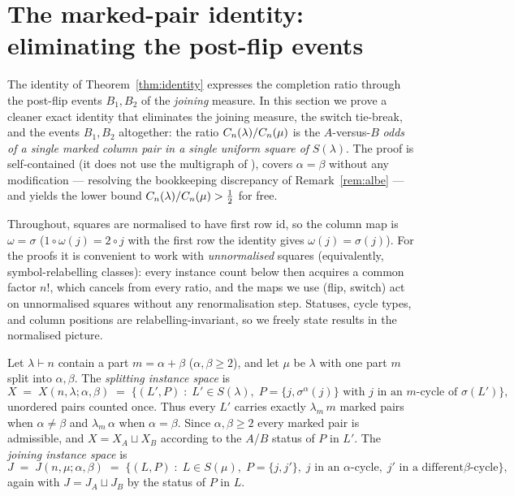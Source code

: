 \section{The marked-pair identity: eliminating the post-flip events}
\label{sec:marked}

The identity of Theorem~\ref{thm:identity} expresses the completion
ratio through the post-flip events $B_1,B_2$ of the \emph{joining}
measure.  In this section we prove a cleaner exact identity that
eliminates the joining measure, the switch tie-break, and the events
$B_1,B_2$ altogether: the ratio $C_n(\lambda)/C_n(\mu)$ is the
$A$-versus-$B$ \emph{odds of a single marked column pair in a single
uniform square of} $S(\lambda)$.  The proof is self-contained (it does
not use the multigraph of \cite{CGW08}), covers $\alpha=\beta$ without
any modification --- resolving the bookkeeping discrepancy of
Remark~\ref{rem:albe} --- and yields the lower bound
$C_n(\lambda)/C_n(\mu)>\tfrac12$ for free.

Throughout, squares are normalised to have first row $\mathrm{id}$, so
the column map is $\omega=\sigma$ ($1\circ\omega(j)=2\circ j$ with the
first row the identity gives $\omega(j)=\sigma(j)$).  For the proofs it
is convenient to work with \emph{unnormalised} squares (equivalently,
symbol-relabelling classes): every instance count below then acquires a
common factor $n!$, which cancels from every ratio, and the maps we use
(flip, switch) act on unnormalised squares without any renormalisation
step.  Statuses, cycle types, and column positions are
relabelling-invariant, so we freely state results in the normalised
picture.

\begin{definition}\label{def:marked}
Let $\lambda\vdash n$ contain a part $m=\alpha+\beta$
($\alpha,\beta\ge2$), and let $\mu$ be $\lambda$ with one part $m$
split into $\alpha,\beta$.  The \emph{splitting instance space} is
\[
X \;=\; X(n,\lambda;\alpha,\beta)
\;=\;\bigl\{(L',P)\;:\;L'\in S(\lambda),\;
P=\{j,\sigma^\alpha(j)\}\text{ with } j\text{ in an $m$-cycle of }
\sigma(L')\bigr\},
\]
unordered pairs counted once.  Thus every $L'$ carries exactly
$\lambda_m\, m$ marked pairs when $\alpha\neq\beta$ and
$\lambda_m\,\alpha$ when $\alpha=\beta$.  Since $\alpha,\beta\ge 2$
every marked pair is admissible, and $X=X_A\sqcup X_B$ according to the
$A$/$B$ status of $P$ in $L'$.  The \emph{joining instance space} is
\[
J \;=\; J(n,\mu;\alpha,\beta)
\;=\;\bigl\{(L,P)\;:\;L\in S(\mu),\;P=\{j,j'\},\;
j\text{ in an $\alpha$-cycle},\; j'\text{ in a different
$\beta$-cycle}\bigr\},
\]
again with $J=J_A\sqcup J_B$ by the status of $P$ in $L$.
\end{definition}

